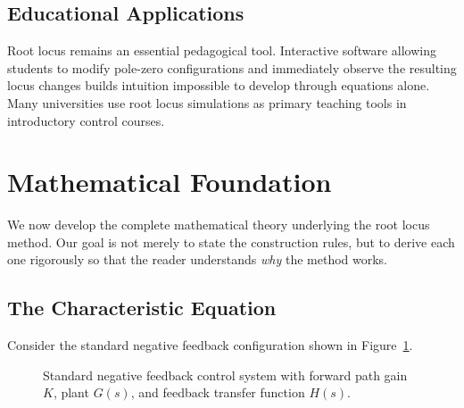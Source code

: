 \subsection{Educational Applications}

Root locus remains an essential pedagogical tool. Interactive software allowing students to modify pole-zero configurations and immediately observe the resulting locus changes builds intuition impossible to develop through equations alone. Many universities use root locus simulations as primary teaching tools in introductory control courses.

\section{Mathematical Foundation}
\label{sec:math_foundation}

We now develop the complete mathematical theory underlying the root locus method. Our goal is not merely to state the construction rules, but to derive each one rigorously so that the reader understands \textit{why} the method works.

\subsection{The Characteristic Equation}

Consider the standard negative feedback configuration shown in Figure~\ref{fig:feedback_block}.

\begin{figure}[H]
\centering
{}
\caption{Standard negative feedback control system with forward path gain $K$, plant $G(s)$, and feedback transfer function $H(s)$.}
\label{fig:feedback_block}
\end{figure}


